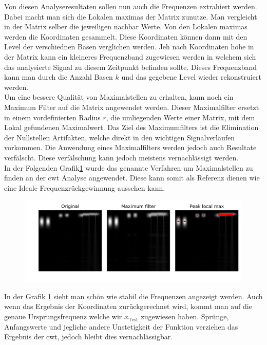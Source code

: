 \newpage

Von diesen Analyseresultaten sollen nun auch die Frequenzen extrahiert werden. Dabei macht man sich die Lokalen maximas der Matrix zunutze. Man vergleicht in der Matrix selber die jeweiligen nachbar Werte. Von den Lokalen maximas werden die Koordinaten gesammelt. Diese Koordinaten können dann mit den Level der verschiednen Basen verglichen werden. Jeh nach Koordinaten höhe in der Matrix kann ein kleineres Frequenzband zugewiesen werden in welchem sich das analysierte Signal zu diesem Zeitpunkt befinden sollte. Dieses Frequenzband kann man durch die Anzahl Basen $k$  und das gegebene Level wieder rekonstruiert werden.\\

Um eine bessere Qualität von Maximalstellen zu erhalten, kann noch ein Maximum Filter auf die Matrix angewendet werden. Dieser Maximalfilter ersetzt in einem vordefinierten Radius $r$, die umliegenden Werte einer Matrix, mit dem Lokal gefundenen Maximalwert. Das Ziel des Maximumfilters ist die Elimination der Nullstellen Artifakten, welche direkt in den wichtigen Signalverläufen vorkommen. Die Anwendung eines Maximalfilters werden jedoch auch Resultate verfälscht. Diese verfälschung kann jedoch meistens vernachlässigt werden.\\

In der Folgenden Grafik\ref{fig:cwt_max} wurde das genannte Verfahren um Maximalstellen zu finden an der cwt Analyse angewendet. Diese kann somit als Referenz dienen wie eine Ideale Frequenzrückgewinnung aussehen kann. 

\begin{figure}[!ht]
	\centering
	\includegraphics[width=\linewidth]{papers/autotune/sections/frames/images/cwtmaxima.jpg}
	\label{fig:cwt_max}
\end{figure}%

In der Grafik \ref{fig:cwt_max} sieht man schön wie stabil die Frequenzen angezeigt werden. Auch wenn das Ergebnis der Koordinaten zurückgerechnet wird, kommt man auf die genaue Ursprungsfrequenz welche wir $x_{\text{Test}}$ zugewiesen haben. Sprünge, Anfangswerte und jegliche andere Unstetigkeit der Funktion verziehen das Ergebnis der cwt, jedoch bleibt dies vernachlässigbar.
\\

